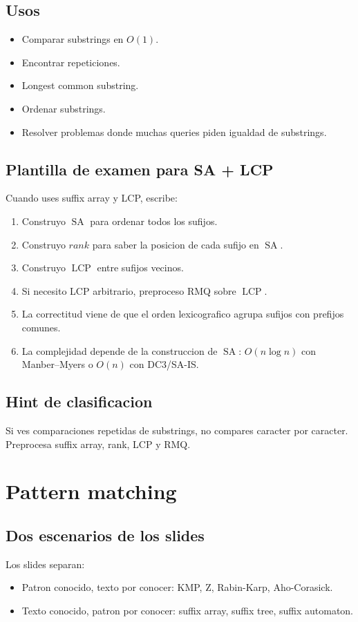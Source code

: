 \documentclass[10pt]{article}
\newcommand{\bigO}{O}
\newcommand{\SA}{\operatorname{SA}}
\newcommand{\LCP}{\operatorname{LCP}}
\begin{document}
\subsection{Usos}
\begin{itemize}[leftmargin=*]
\item Comparar substrings en $\bigO(1)$.
\item Encontrar repeticiones.
\item Longest common substring.
\item Ordenar substrings.
\item Resolver problemas donde muchas queries piden igualdad de substrings.
\end{itemize}

\subsection{Plantilla de examen para SA + LCP}
Cuando uses suffix array y LCP, escribe:
\begin{enumerate}[leftmargin=*]
\item Construyo $\SA$ para ordenar todos los sufijos.
\item Construyo $rank$ para saber la posicion de cada sufijo en $\SA$.
\item Construyo $\LCP$ entre sufijos vecinos.
\item Si necesito LCP arbitrario, preproceso RMQ sobre $\LCP$.
\item La correctitud viene de que el orden lexicografico agrupa sufijos con
prefijos comunes.
\item La complejidad depende de la construccion de $\SA$: $\bigO(n\log n)$ con
Manber--Myers o $\bigO(n)$ con DC3/SA-IS.
\end{enumerate}

\subsection{Hint de clasificacion}
Si ves comparaciones repetidas de substrings, no compares caracter por caracter.
Preprocesa suffix array, rank, LCP y RMQ.

\newpage
\section{Pattern matching}

\subsection{Dos escenarios de los slides}
Los slides separan:
\begin{itemize}[leftmargin=*]
\item Patron conocido, texto por conocer: KMP, Z, Rabin-Karp, Aho-Corasick.
\item Texto conocido, patron por conocer: suffix array, suffix tree, suffix automaton.
\end{itemize}
\end{document}
